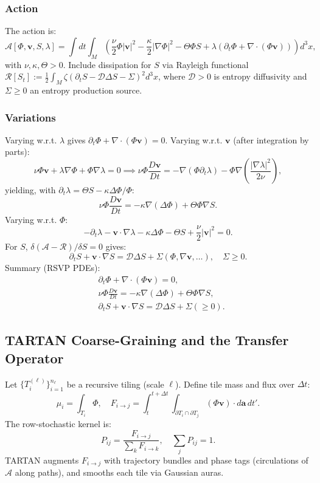 \documentclass[11pt]{article}
\theoremstyle{plain}
\theoremstyle{definition}
\begin{document}
\subsubsection{Action}
The action is:
\[
\mathcal{A}[\Phi, \bm{v}, S, \lambda] = \int dt \int_M \left( \frac{\nu}{2} \Phi |\bm{v}|^2 - \frac{\kappa}{2} |\nabla \Phi|^2 - \Theta \Phi S + \lambda (\partial_t \Phi + \nabla \cdot (\Phi \bm{v})) \right) d^3x,
\]
with $\nu, \kappa, \Theta > 0$. Include dissipation for $S$ via Rayleigh functional $\mathcal{R}[S_t] := \frac{1}{2} \int_M \zeta (\partial_t S - \mathcal{D} \Delta S - \Sigma)^2 d^3x$, where $\mathcal{D} > 0$ is entropy diffusivity and $\Sigma \geq 0$ an entropy production source.
\subsubsection{Variations}
Varying w.r.t. $\lambda$ gives $\partial_t \Phi + \nabla \cdot (\Phi \bm{v}) = 0$.
Varying w.r.t. $\bm{v}$ (after integration by parts):
\[
\nu \Phi \bm{v} + \lambda \nabla \Phi + \Phi \nabla \lambda = 0 \implies \nu \Phi \frac{D \bm{v}}{Dt} = -\nabla (\Phi \partial_t \lambda) - \Phi \nabla \left( \frac{|\nabla \lambda|^2}{2\nu} \right),
\]
yielding, with $\partial_t \lambda = \Theta S - \kappa \Delta \Phi / \Phi$:
\[
\nu \Phi \frac{D \bm{v}}{Dt} = -\kappa \nabla (\Delta \Phi) + \Theta \Phi \nabla S.
\]
Varying w.r.t. $\Phi$:
\[
-\partial_t \lambda - \bm{v} \cdot \nabla \lambda - \kappa \Delta \Phi - \Theta S + \frac{\nu}{2} |\bm{v}|^2 = 0.
\]
For $S$, $\delta (\mathcal{A} - \mathcal{R}) / \delta S = 0$ gives:
\[
\partial_t S + \bm{v} \cdot \nabla S = \mathcal{D} \Delta S + \Sigma (\Phi, \nabla \bm{v}, \dots), \quad \Sigma \geq 0.
\]
Summary (RSVP PDEs):
\[
\boxed{
\begin{aligned}
&\partial_t \Phi + \nabla \cdot (\Phi \bm{v}) = 0, \\
&\nu \Phi \frac{D \bm{v}}{Dt} = -\kappa \nabla (\Delta \Phi) + \Theta \Phi \nabla S, \\
&\partial_t S + \bm{v} \cdot \nabla S = \mathcal{D} \Delta S + \Sigma (\geq 0).
\end{aligned}
}
\]
\subsection{TARTAN Coarse-Graining and the Transfer Operator}
Let $\{T_i^{(\ell)}\}_{i=1}^{n_\ell}$ be a recursive tiling (scale $\ell$). Define tile mass and flux over $\Delta t$:
\[
\mu_i = \int_{T_i} \Phi, \quad F_{i \to j} = \int_t^{t+\Delta t} \int_{\partial T_i \cap \partial T_j} (\Phi \bm{v}) \cdot d\bm{a} \, dt'.
\]
The row-stochastic kernel is:
\[
P_{ij} = \frac{F_{i \to j}}{\sum_k F_{i \to k}}, \quad \sum_j P_{ij} = 1.
\]
TARTAN augments $F_{i \to j}$ with trajectory bundles and phase tags (circulations of $\mathcal{A}$ along paths), and smooths each tile via Gaussian auras.
\end{document}
